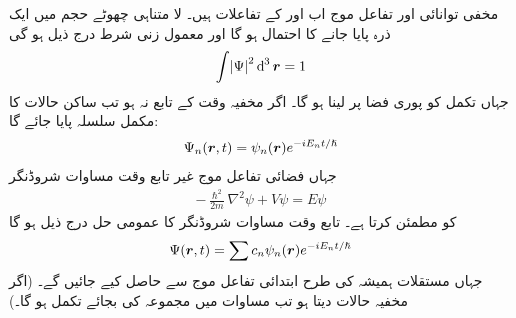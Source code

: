 مخفی توانائی    اور تفاعل موج      اب  اور  کے تفاعلات ہیں۔ لا متناہی چھوٹے حجم   میں ایک ذرہ  پایا جانے کا احتمال       ہو گا اور معمول زنی شرط درج ذیل ہو گی
\begin{align}\label{مساوات_ابعادی_معمول_زنی_شرط}
\int\abs{\Psi}^{2}\dif^{\,3}\kvec{r}=1 
\end{align}
جہاں تکمل کو پوری فضا پر لینا ہو گا۔ اگر مخفیہ وقت کے تابع نہ ہو  تب ساکن حالات کا مکمل سلسلہ پایا جائے گا:
\begin{align}
\Psi_{n}({{\boldsymbol{r}}},t)=\psi_{n}({{\boldsymbol{r}}})e^{-iE_{n}t/\hslash} 
\end{align}
جہاں فضائی تفاعل موج     غیر تابع وقت مساوات شروڈنگر 
\begin{align}
-\frac{\hslash^{2}}{2m}\nabla^{2}\psi+V\psi=E\psi
\end{align}
کو مطمئن کرتا ہے۔ تابع وقت مساوات شروڈنگر کا عمومی حل درج ذیل ہو گا
\begin{align}\label{مساوات_ابعادی_عمومی_حل_الف}
\Psi({{\boldsymbol{r}}},t)=\sum c_{n}\psi_{n}({{\boldsymbol{r}}})e^{-iE_{n}t/\hslash} 
\end{align}
جہاں مستقلات   ہمیشہ کی طرح ابتدائی تفاعل موج     سے حاصل کیے جائیں گے۔ (اگر مخفیہ     حالات دیتا  ہو تب مساوات  میں مجموعہ کی بجائے تکمل ہو گا۔)

